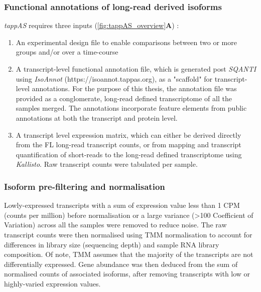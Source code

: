 \clearpage
\subsubsection{Functional annotations of long-read derived isoforms}
\textit{tappAS} requires three inputs (\cref{fig:tappAS_overview}\textbf{A}) :
\begin{enumerate}
	\item An experimental design file to enable comparisons between two or more groups and/or over a time-course 
	\item A transcript-level functional annotation file, which is generated post \textit{SQANTI} using \textit{IsoAnnot} (https://isoannot.tappas.org), as a "scaffold" for transcript-level annotations. For the purpose of this thesis, the annotation file was provided as a conglomerate, long-read defined transcriptome of all the samples merged. The annotations incorporate feature elements from public annotations at both the transcript and protein level. 
	\item A transcript level expression matrix, which can either be derived directly from the FL long-read transcript counts, or from mapping and transcript quantification of short-reads to the long-read defined transcriptome using \textit{Kallisto}\cite{Bray2016}. Raw transcript counts were tabulated per sample.  	 
\end{enumerate}


\subsubsection{Isoform pre-filtering and normalisation}
Lowly-expressed transcripts with a sum of expression value less than 1 CPM (counts per million) before normalisation or a large variance (>100 Coefficient of Variation) across all the samples were removed to reduce noise. The raw transcript counts were then normalised using TMM normalisation \cite{Robinson2010} to account for differences in library size (sequencing depth) and sample RNA library composition. Of note, TMM assumes that the majority of the transcripts are not differentially expressed. Gene abundance was then deduced from the sum of normalised counts of associated isoforms, after removing transcripts with low or highly-varied expression values. 
 

